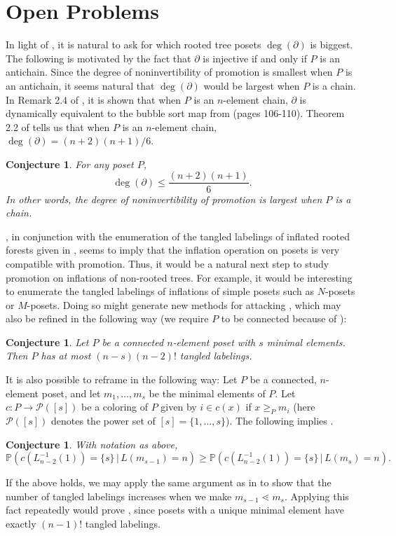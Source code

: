 \documentclass[11pt]{amsart}
\newtheorem{conjecture}[thm]{Conjecture}
\theoremstyle{definition}
\newcommand{\Prob}{\mathbb{P}}
\newcommand{\inverse}{^{-1}}
\begin{document}
\section{Open Problems}\label{Open}
In light of , it is natural to ask for which rooted tree posets $ \deg(\partial) $ is biggest. The following is motivated by the fact that $ \partial $ is injective if and only if $ P $ is an antichain. Since the degree of noninvertibility of promotion is smallest when $ P $ is an antichain, it seems natural that $ \deg(\partial) $ would be largest when $ P $ is a chain. In Remark 2.4 of \cite{DK20}, it is shown that when $ P $ is an $ n $-element chain, $ \partial $ is dynamically equivalent to the bubble sort map from \cite{Knuth1973} (pages 106-110). Theorem 2.2 of \cite{DP20} tells us that when $ P $ is an $ n $-element chain, $ \deg(\partial)=(n+2)(n+1)/{6} $. \begin{conjecture}
	For any poset $ P $, \[\deg(\partial)\leq\frac{(n+2)(n+1)}{6}.\] In other words, the degree of noninvertibility of promotion is largest when $ P $ is a chain.
\end{conjecture}

, in conjunction with the enumeration of the tangled labelings of inflated rooted forests given in \cite{DP20}, seems to imply that the inflation operation on posets is very compatible with promotion. Thus, it would be a natural next step to study promotion on inflations of non-rooted trees. For example, it would be interesting to enumerate the tangled labelings of inflations of simple posets such as $ N $-posets or $ M $-posets. Doing so might generate new methods for attacking , which may also be refined in the following way (we require $ P $ to be connected because of ):
\begin{conjecture}
	Let $ P $ be a connected $ n $-element poset with $ s $ minimal elements. Then $ P $ has at most $ (n-s)(n-2)! $ tangled labelings.
\end{conjecture}

It is also possible to reframe  in the following way: Let $ P $ be a connected, $ n $-element poset, and let $ m_1,\ldots,m_s $ be the minimal elements of $ P $. Let $ c:P\to \mathcal{P}([s]) $ be a coloring of $ P $ given by $ i\in c(x) $ if $ x\geq_P m_i $ (here $ \mathcal{P}([s]) $ denotes the power set of $ [s]=\{1,\ldots,s\} $). The following implies . \begin{conjecture}
	With notation as above, \[\Prob\left(c(L_{n-2}\inverse(1))=\{s\}\,|\,L(m_{s-1})=n\right)\geq\Prob\left(c(L_{n-2}\inverse(1))=\{s\}\,|\,L(m_{s})=n\right).\]
\end{conjecture} If the above holds, we may apply the same argument as in  to show that the number of tangled labelings increases when we make $ m_{s-1}\lessdot m_s $. Applying this fact repeatedly would prove , since posets with a unique minimal element have exactly $ (n-1)! $ tangled labelings.
\end{document}
